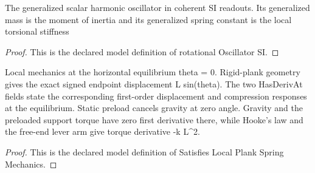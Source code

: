 \begin{definition}
  \label{def:physics:phyx-mini-0232:phyxminiproblems-problemphyxmini0232-rotationaloscillatorsi}
  The generalized scalar harmonic oscillator in coherent SI readouts. Its generalized mass is the moment of inertia and its generalized spring constant is the local torsional stiffness
\end{definition}
\begin{proof}
  This is the declared model definition of rotational Oscillator SI.
\end{proof}
\begin{definition}
  \label{def:physics:phyx-mini-0232:phyxminiproblems-problemphyxmini0232-satisfieslocalplankspringmechanics}
  Local mechanics at the horizontal equilibrium theta = 0. Rigid-plank geometry gives the exact signed endpoint displacement L sin(theta). The two HasDerivAt fields state the corresponding first-order displacement and compression responses at the equilibrium. Static preload cancels gravity at zero angle. Gravity and the preloaded support torque have zero first derivative there, while Hooke's law and the free-end lever arm give torque derivative -k L\textasciicircum{}2.
\end{definition}
\begin{proof}
  This is the declared model definition of Satisfies Local Plank Spring Mechanics.
\end{proof}
